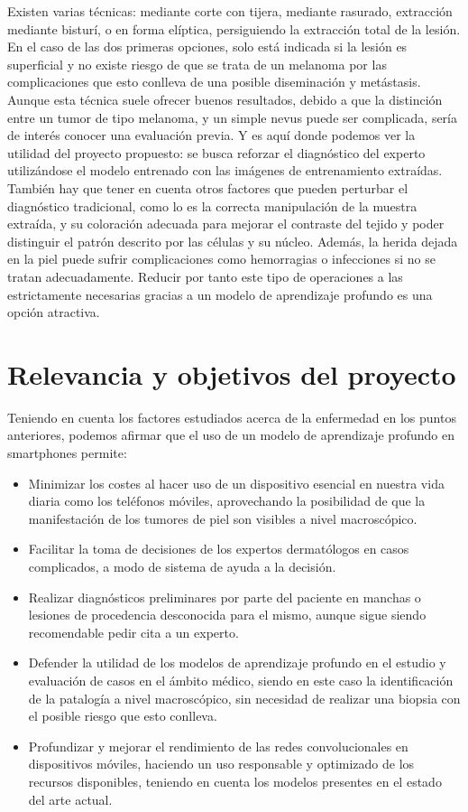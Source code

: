Existen varias técnicas: mediante corte con tijera, mediante rasurado, extracción mediante bisturí, o en forma elíptica, persiguiendo la extracción total de la lesión. En el caso de las dos primeras opciones, solo está indicada si la lesión es superficial y no existe riesgo de que se trata de un melanoma por las complicaciones que esto conlleva de una posible diseminación y metástasis. \\

Aunque esta técnica suele ofrecer buenos resultados, debido a que la distinción entre un tumor de tipo melanoma, y un simple nevus puede ser complicada, sería de interés conocer una evaluación previa. Y es aquí donde podemos ver la utilidad del proyecto propuesto: se busca reforzar el diagnóstico del experto utilizándose el modelo entrenado con las imágenes de entrenamiento extraídas.\\

También hay que tener en cuenta otros factores que pueden perturbar el diagnóstico tradicional, como lo es la correcta manipulación de la muestra extraída, y su coloración adecuada para mejorar el contraste del tejido y poder distinguir el patrón descrito por las células y su núcleo. Además, la herida dejada en la piel puede sufrir complicaciones como hemorragias o infecciones si no se tratan adecuadamente. Reducir por tanto este tipo de operaciones a las estrictamente necesarias gracias a un modelo de aprendizaje profundo es una opción atractiva.

\section{Relevancia y objetivos del proyecto}

Teniendo en cuenta los factores estudiados acerca de la enfermedad en los puntos anteriores, podemos afirmar que el uso de un modelo de aprendizaje profundo en smartphones permite:
\begin{itemize}
	\item Minimizar los costes al hacer uso de un dispositivo esencial en nuestra vida diaria como los teléfonos móviles, aprovechando la posibilidad de que la manifestación de los tumores de piel son visibles a nivel macroscópico.
	\item Facilitar la toma de decisiones de los expertos dermatólogos en casos complicados, a modo de sistema de ayuda a la decisión.
	\item Realizar diagnósticos preliminares por parte del paciente en manchas o lesiones de procedencia desconocida para el mismo, aunque sigue siendo recomendable pedir cita a un experto.
	\item Defender la utilidad de los modelos de aprendizaje profundo en el estudio y evaluación de casos en el ámbito médico, siendo en este caso la identificación de la patalogía a nivel macroscópico, sin necesidad de realizar una biopsia con el posible riesgo que esto conlleva.
	\item Profundizar y mejorar el rendimiento de las redes convolucionales en dispositivos móviles, haciendo un uso responsable y optimizado de los recursos disponibles, teniendo en cuenta los modelos presentes en el estado del arte actual.
\end{itemize}

